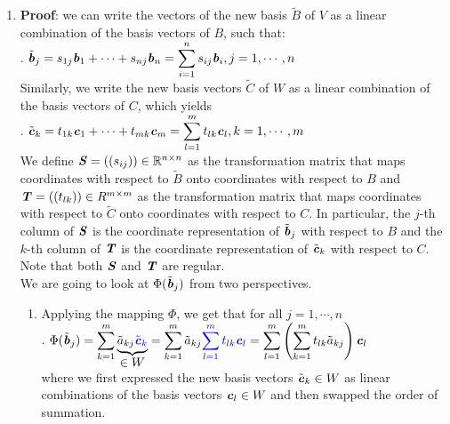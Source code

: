 \begin{enumerate}
    \item \textbf{Proof}: we can write the vectors of the new basis $\tilde{B}$ of $V$ as a linear combination of the basis vectors of $B$, such that:
    \hfill \cite{mfml/book/mml/Deisenroth-Faisal-Ong}
    \\
    .\hfill
    $
        \tilde{\text{\textbf{\textit{b}}}}_j 
        = s_{1j} \text{\textbf{\textit{b}}}_1 + \cdots + s_{nj} \text{\textbf{\textit{b}}}_n 
        = \displaystyle\sum^n _{i=1} s_{ij} \text{\textbf{\textit{b}}}_i 
        , j = 1, \cdots , n
    $
    \hfill \cite{mfml/book/mml/Deisenroth-Faisal-Ong}
    \\
    Similarly, we write the new basis vectors $\tilde{C}$ of $W$ as a linear combination of the basis vectors of $C$, which yields
    \hfill \cite{mfml/book/mml/Deisenroth-Faisal-Ong}
    \\
    .\hfill
    $
        \tilde{\text{\textbf{\textit{c}}}}_k 
        = t_{1k} \text{\textbf{\textit{c}}}_1 + \cdots + t_{mk} \text{\textbf{\textit{c}}}_m 
        = \displaystyle\sum^m _{l=1} t_{lk} \text{\textbf{\textit{c}}}_l 
        , k = 1, \cdots , m
    $
    \hfill \cite{mfml/book/mml/Deisenroth-Faisal-Ong}
    \\
    We define $\text{\textbf{\textit{S}}} = ((s_{ij} )) \in \mathbb{R}^{n\times n}$ as the transformation matrix that maps coordinates with respect to $\tilde{B}$ onto coordinates with respect to $B$ and $\text{\textbf{\textit{T}}} = ((t_{lk})) \in R^{m\times m}$ as the transformation matrix that maps coordinates with respect to $\tilde{C}$ onto coordinates with respect to $C$. 
    In particular, the $j$-th column of $\text{\textbf{\textit{S}}}$ is the coordinate representation of $\tilde{\text{\textbf{\textit{b}}}}_j$ with respect to $B$ and the $k$-th column of $\text{\textbf{\textit{T}}}$ is the coordinate representation of $\tilde{\text{\textbf{\textit{c}}}}_k$ with respect to $C$. 
    Note that both $\text{\textbf{\textit{S}}}$ and $\text{\textbf{\textit{T}}}$ are regular.
    \hfill \cite{mfml/book/mml/Deisenroth-Faisal-Ong}
    \\
    We are going to look at $\Phi(\tilde{\text{\textbf{\textit{b}}}}_j )$ from two perspectives.
    \hfill \cite{mfml/book/mml/Deisenroth-Faisal-Ong}
    \begin{enumerate}
        \item Applying the mapping $\Phi$, we get that for all $j = 1, \cdots , n$
        \hfill \cite{mfml/book/mml/Deisenroth-Faisal-Ong}
        \\
        .\hfill
        $
            \Phi(\tilde{\text{\textbf{\textit{b}}}}_j )
            = \displaystyle\sum^m_{k=1} \underset{\displaystyle \in W}{
                \underbrace{\tilde{a}_{kj} \textcolor{blue}{\tilde{\text{\textbf{\textit{c}}}}_k}}
            }
            = \displaystyle\sum^m_{k=1} \tilde{a}_{kj} \textcolor{blue}{
                \displaystyle\sum^m_{l=1} t_{lk} \text{\textbf{\textit{c}}}_l
            }
            = \displaystyle\sum^m_{l=1} \left(
                \displaystyle\sum^m_{k=1} t_{lk} \tilde{a}_{kj} 
            \right)  \text{\textbf{\textit{c}}}_l
        $
        \hfill \cite{mfml/book/mml/Deisenroth-Faisal-Ong}
        \\
        where we first expressed the new basis vectors $\tilde{\text{\textbf{\textit{c}}}}_k \in W$ as linear combinations of the basis vectors $\text{\textbf{\textit{c}}}_l \in W$ and then swapped the order of summation.
        \hfill \cite{mfml/book/mml/Deisenroth-Faisal-Ong}



\end{enumerate}
\end{enumerate}
